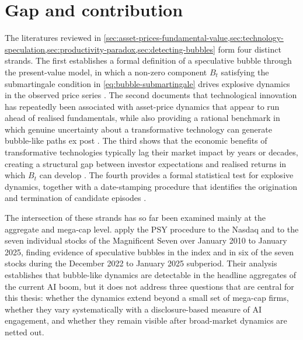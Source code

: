 \section{Gap and contribution}
\label{sec:bubbles-gap-contribution}

The literatures reviewed in \cref{sec:asset-prices-fundamental-value,sec:technology-speculation,sec:productivity-paradox,sec:detecting-bubbles} form four distinct strands. The first establishes a formal definition of a speculative bubble through the present-value model, in which a non-zero component $B_t$ satisfying the submartingale condition in \cref{eq:bubble-submartingale} drives explosive dynamics in the observed price series \citep{phillipsShiYu2015a}. The second documents that technological innovation has repeatedly been associated with asset-price dynamics that appear to run ahead of realised fundamentals, while also providing a rational benchmark in which genuine uncertainty about a transformative technology can generate bubble-like paths ex post \citep{kindlebergerAliber2015,pastorVeronesi2009}. The third shows that the economic benefits of transformative technologies typically lag their market impact by years or decades, creating a structural gap between investor expectations and realised returns in which $B_t$ can develop \citep{brynjolfsson1993,david1990}. The fourth provides a formal statistical test for explosive dynamics, together with a date-stamping procedure that identifies the origination and termination of candidate episodes \citep{phillipsWuYu2011,phillipsShiYu2015a,phillipsShiYu2015b}.

The intersection of these strands has so far been examined mainly at the aggregate and mega-cap level. \citet{baselePhillipsShi2025} apply the PSY procedure to the Nasdaq and to the seven individual stocks of the Magnificent Seven over January 2010 to January 2025, finding evidence of speculative bubbles in the index and in six of the seven stocks during the December 2022 to January 2025 subperiod. Their analysis establishes that bubble-like dynamics are detectable in the headline aggregates of the current AI boom, but it does not address three questions that are central for this thesis: whether the dynamics extend beyond a small set of mega-cap firms, whether they vary systematically with a disclosure-based measure of AI engagement, and whether they remain visible after broad-market dynamics are netted out.

